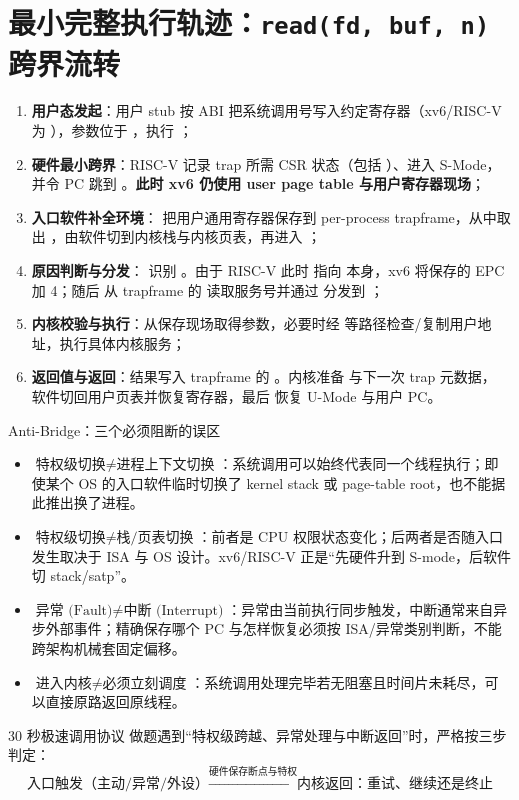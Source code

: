 \documentclass[UTF8,fontset=none,11pt,a4paper]{ctexart}
\begin{document}
\section{最小完整执行轨迹：\texttt{read(fd, buf, n)} 跨界流转}

\begin{enumerate}
  \item \textbf{用户态发起}：用户 stub 按 ABI 把系统调用号写入约定寄存器（xv6/RISC-V 为 ），参数位于 ，执行 ；
  \item \textbf{硬件最小跨界}：RISC-V 记录 trap 所需 CSR 状态（包括 ）、进入 S-Mode，并令 PC 跳到 。\textbf{此时 xv6 仍使用 user page table 与用户寄存器现场}；
  \item \textbf{入口软件补全环境}： 把用户通用寄存器保存到 per-process trapframe，从中取出 ，由软件切到内核栈与内核页表，再进入 ；
  \item \textbf{原因判断与分发}： 识别 。由于 RISC-V 此时  指向  本身，xv6 将保存的 EPC 加 4；随后  从 trapframe 的  读取服务号并通过  分发到 ；
  \item \textbf{内核校验与执行}：从保存现场取得参数，必要时经  等路径检查/复制用户地址，执行具体内核服务；
  \item \textbf{返回值与返回}：结果写入 trapframe 的 。内核准备  与下一次 trap 元数据， 软件切回用户页表并恢复寄存器，最后  恢复 U-Mode 与用户 PC。
\end{enumerate}

\begin{warnbox}{Anti-Bridge：三个必须阻断的误区}
\begin{itemize}
  \item \(\text{特权级切换} \neq \text{进程上下文切换}\)：系统调用可以始终代表同一个线程执行；即使某个 OS 的入口软件临时切换了 kernel stack 或 page-table root，也不能据此推出换了进程。
  \item \(\text{特权级切换} \neq \text{栈/页表切换}\)：前者是 CPU 权限状态变化；后两者是否随入口发生取决于 ISA 与 OS 设计。xv6/RISC-V 正是“先硬件升到 S-mode，后软件切 stack/satp”。
  \item \(\text{异常 (Fault)} \neq \text{中断 (Interrupt)}\)：异常由当前执行同步触发，中断通常来自异步外部事件；精确保存哪个 PC 与怎样恢复必须按 ISA/异常类别判断，不能跨架构机械套固定偏移。
  \item \(\text{进入内核} \neq \text{必须立刻调度}\)：系统调用处理完毕若无阻塞且时间片未耗尽，可以直接原路返回原线程。
\end{itemize}
\end{warnbox}

\begin{corebox}{30 秒极速调用协议}
做题遇到“特权级跨越、异常处理与中断返回”时，严格按三步判定：
\[
\boxed{\text{入口触发（主动/异常/外设）}} \xrightarrow{\text{硬件保存断点与特权}} \boxed{\text{内核返回：重试、继续还是终止}}
\]
\end{corebox}
\end{document}
